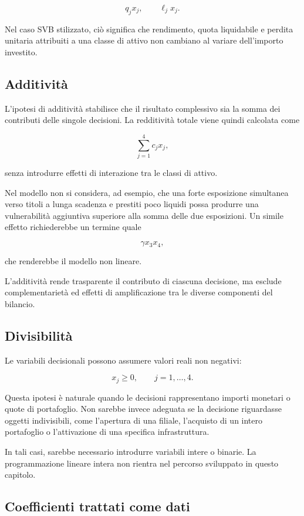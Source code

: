 \[
q_jx_j,
\qquad
\ell_jx_j.
\]

Nel caso SVB stilizzato, ci\`o significa che rendimento, quota liquidabile e
perdita unitaria attribuiti a una classe di attivo non cambiano al variare
dell'importo investito.

\subsection{Additivit\`a}

L'ipotesi di additivit\`a stabilisce che il risultato complessivo sia la somma
dei contributi delle singole decisioni. La redditivit\`a totale viene quindi
calcolata come

\[
\sum_{j=1}^{4}c_jx_j,
\]

\noindent senza introdurre effetti di interazione tra le classi di attivo.

Nel modello non si considera, ad esempio, che una forte esposizione simultanea
verso titoli a lunga scadenza e prestiti poco liquidi possa produrre una
vulnerabilit\`a aggiuntiva superiore alla somma delle due esposizioni. Un
simile effetto richiederebbe un termine quale

\[
\gamma x_3x_4,
\]

che renderebbe il modello non lineare.

L'additivit\`a rende trasparente il contributo di ciascuna decisione, ma
esclude complementariet\`a ed effetti di amplificazione tra le diverse
componenti del bilancio.

\subsection{Divisibilit\`a}

Le variabili decisionali possono assumere valori reali non negativi:

\[
x_j\geq 0,
\qquad
j=1,\ldots,4.
\]

Questa ipotesi \`e naturale quando le decisioni rappresentano importi monetari
o quote di portafoglio. Non sarebbe invece adeguata se la decisione riguardasse
oggetti indivisibili, come l'apertura di una filiale, l'acquisto di un intero
portafoglio o l'attivazione di una specifica infrastruttura.

In tali casi, sarebbe necessario introdurre variabili intere o binarie. La
programmazione lineare intera non rientra nel percorso sviluppato in questo
capitolo.

\subsection{Coefficienti trattati come dati}

